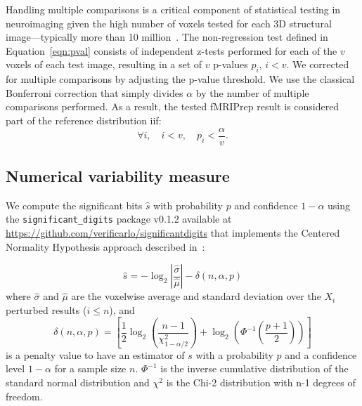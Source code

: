 \documentclass{article}
\newcommand{\fmriprep}{fMRIPrep\xspace}
\begin{document}
Handling multiple comparisons is a critical component of statistical testing in
neuroimaging given the high number of voxels tested for each 3D structural
image---typically more than 10 million~\cite{NICHOLS2007246}. The non-regression
test defined in Equation~\ref{eqn:pval} consists of independent z-tests performed
for each of the $v$ voxels of each test image, resulting in a set of $v$
p-values $p_i$, $i < v$. We corrected for multiple comparisons by adjusting the p-value
threshold. We use the classical Bonferroni correction that simply divides
$\alpha$ by the number of multiple comparisons performed. As a result, the
tested \fmriprep result is considered part of the reference distribution iif:
\begin{equation}
    \label{eq:bonferroni}
    \forall i, \quad i < v, \quad p_i < \frac{\alpha}{v}.
\end{equation}



\subsection*{Numerical variability measure}

We compute the significant bits $\hat{s}$ with probability $p$ and confidence $1-\alpha$
using the \texttt{significant\_digits} package
v0.1.2 available at \url{https://github.com/verificarlo/significantdigits} that
implements the Centered Normality Hypothesis approach described in~\cite{sohier2021confidence}:

\[
    \hat{s} = -\log_2 \left| \frac{\hat{\sigma}}{\hat{\mu}} \right| - \delta(n, \alpha, p)
\]
where $\hat{\sigma}$ and $\hat{\mu}$ are the voxelwise average and standard
deviation over the $X_i$ perturbed results ($i \leq n$),
and
\[
    \delta(n, \alpha, p) =
    \left[
        \frac{1}{2} \log_2 \left( \frac{n-1}{\chi^2_{1-\alpha/2}} \right) +
        \log_2 \left( \Phi^{-1} \left( \frac{p+1}{2} \right) \right)
        \right]
\]
is a penalty value to have an estimator of $s$ with a probability $p$ and a confidence level $1-\alpha$ for
a sample size $n$. $\Phi^{-1}$ is the inverse cumulative distribution of the standard normal distribution
and $\chi^2$ is the Chi-2 distribution with n-1 degrees of freedom.
\end{document}
